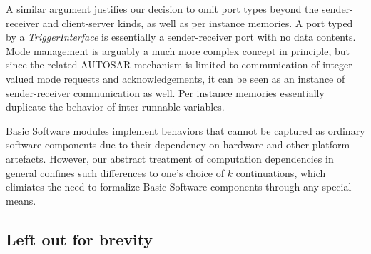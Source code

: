 \documentclass[twocolumn]{article}
\begin{document}
A similar argument justifies our decision to omit port types beyond the sender-receiver and client-server kinds, as well as per instance memories. A port typed by a \emph{TriggerInterface} is essentially a sender-receiver port with no data contents. Mode management is arguably a much more complex concept in principle, but since the related AUTOSAR mechanism is limited to communication of integer-valued mode requests and acknowledgements, it can be seen as an instance of sender-receiver communication as well. Per instance memories essentially duplicate the behavior of inter-runnable variables.

Basic Software modules implement behaviors that cannot be captured as ordinary software components due to their dependency on hardware and other platform artefacts. However, our abstract treatment of computation dependencies in general confines such differences to one's choice of $k$ continuations, which elimiates the need to formalize Basic Software components through any special means.


\subsection{Left out for brevity}
\end{document}
